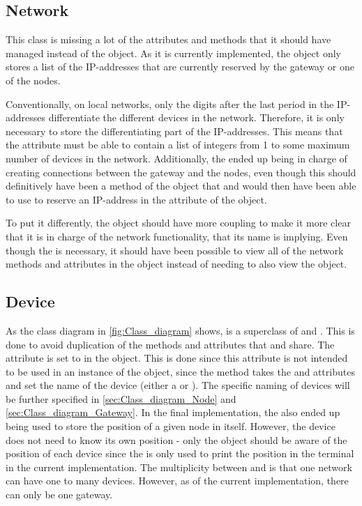 \subsection{Network}\label{sec:Class_diagram_Network}
This class is missing a lot of the attributes and methods that it should have managed instead of the  object. As it is currently implemented, the  object only stores a list of the IP-addresses that are currently reserved by the gateway or one of the nodes.\bigbreak

\noindent Conventionally, on local networks, only the digits after the last period in the IP-addresses differentiate the different devices in the network. Therefore, it is only necessary to store the differentiating part of the IP-addresses. This means that the attribute  must be able to contain a list of integers from 1 to some maximum number of devices in the network. Additionally, the  ended up being in charge of creating connections between the gateway and the nodes, even though this should definitively have been a method of the  object that  and  would then have been able to use to reserve an IP-address in the  attribute of the  object.\newline

\noindent To put it differently, the  object should have more coupling to make it more clear that it is in charge of the network functionality, that its name is implying. Even though the  is necessary, it should have been possible to view all of the network methods and attributes in the  object instead of needing to also view the  object.

\subsection{Device}
As the class diagram in \autoref{fig:Class_diagram} shows,  is a superclass of  and . This is done to avoid duplication of the methods and attributes that  and  share. The attribute  is set to  in the  object. This is done since this attribute is not intended to be used in an instance of the  object, since the  method takes the  and  attributes and set the name of the device (either a  or ). The specific naming of devices will be further specified in \autoref{sec:Class_diagram_Node} and \autoref{sec:Class_diagram_Gateway}. In the final implementation, the  also ended up being used to store the position of a given node in itself. However, the device does not need to know its own position - only the  object should be aware of the position of each device since the  is only used to print the position in the terminal in the current implementation. The multiplicity between  and  is that one network can have one to many devices. However, as of the current implementation, there can only be one gateway.

